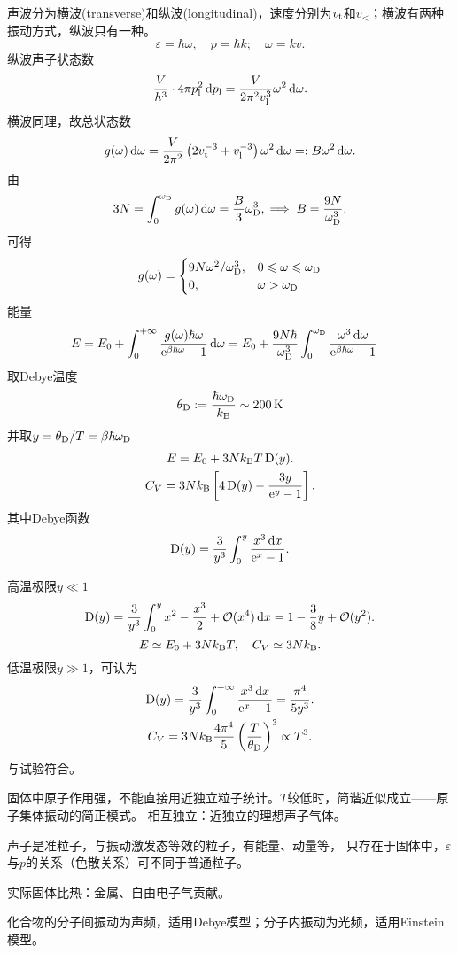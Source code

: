 声波分为横波(transverse)和纵波(longitudinal)，速度分别为$v_\mathrm t$和$v_\lt$；横波有两种振动方式，纵波只有一种。
\[
	\varepsilon=\hbar\omega,\quad p=\hbar k;\quad \omega=kv.
\]
纵波声子状态数
\[
	\frac V{h^3}\cdot 4\pi p_\mathrm l^2\mathop{}\!\mathrm{d} p_\mathrm l=\frac V{2\pi^2v_\mathrm l^3}\omega^2\mathop{}\!\mathrm{d}\omega.
\]
横波同理，故总状态数
\[
	g(\omega)\mathop{}\!\mathrm{d}\omega=\frac V{2\pi^2}\left(2v_\mathrm t^{-3}+v_\mathrm l^{-3}\right)\omega^2\mathop{}\!\mathrm{d}\omega=:B\omega^2\mathop{}\!\mathrm{d}\omega.
\]
由
\[
	3	N=\int_0^{\omega_\mathrm D}g(\omega)\mathop{}\!\mathrm{d}\omega=\frac B3\omega_\mathrm D^3,\implies B=\frac{9N}{\omega_\mathrm D^3}.
\]
可得
\begin{align*}
	g(\omega)=\begin{cases}
		9N\omega^2/\omega_\mathrm D^3,&0\leqslant\omega\leqslant\omega_\mathrm D\\
		0,&\omega>\omega_\mathrm D
	\end{cases}
\end{align*}
能量 
\begin{align*}
	E&=E_0+\int_0^{+\infty}\frac{ g(\omega)\hbar\omega}{\mathop{}\!\mathrm{e}^{\beta\hbar\omega}-1}\mathop{}\!\mathrm{d}\omega=E_0+\frac{9N\hbar}{\omega_\mathrm D^3}\int_0^{\omega_\mathrm D}\frac{\omega^3\mathop{}\!\mathrm{d}\omega}{\mathop{}\!\mathrm{e}^{\beta\hbar\omega}-1}
\end{align*}
取Debye温度
\[
	\theta_\Db:=\frac{\hbar\omega_\Db}\kB\sim\SI{200}\K
\]
并取$y=\theta_\mathrm D/T=\beta\hbar\omega_\mathrm D$
\begin{gather}
	E=E_0+3Nk_{\mathrm B} T\operatorname{D}(y).\\
	C_V=3Nk_{\mathrm B}\left[4\operatorname{D}(y)-\frac{3y}{\mathop{}\!\mathrm{e}^{y}-1}\right].
\end{gather}
其中Debye函数
\[
	\operatorname{D}(y)=\frac 3{y^3}\int_0^{y}\frac{x^3\mathop{}\!\mathrm{d} x}{\mathop{}\!\mathrm{e}^ x-1}.
\]

高温极限$y\ll 1$
\begin{align*}
	\operatorname{D}(y)=\frac3{y^3}\int_0^yx^2-\frac{x^3}2+\mathcal O(x^4)\mathop{}\!\mathrm{d} x=1-\frac38y+\mathcal O(y^2).
\end{align*}
\[
	E\simeq E_0+3Nk_{\mathrm B} T,\quad C_V\simeq 3Nk_{\mathrm B}.
\]
低温极限$y\gg 1$，可认为
\begin{gather}
	\notag
	\operatorname{D}(y)=\frac3{y^3}\int_0^{+\infty}\frac{x^3\mathop{}\!\mathrm{d} x}{\mathop{}\!\mathrm{e}^ x-1}=\frac{\pi^4}{5y^3}.\\
	\label{eqn:CV-Debye}
	C_V=3Nk_{\mathrm B}\frac{4\pi^4}5\left(\frac T{\theta_\mathrm D}\right)^3\propto T^3.
\end{gather}
与试验符合。
\begin{compactenum}
	\item 固体中原子作用强，不能直接用近独立粒子统计。$T$较低时，简谐近似成立——原子集体振动的简正模式。
	相互独立：近独立的理想声子气体。
	\item 声子是准粒子，与振动激发态等效的粒子，有能量、动量等，
	只存在于固体中，$\varepsilon$与$p$的关系（色散关系）可不同于普通粒子。
	\item 实际固体比热：金属、自由电子气贡献。

	化合物的分子间振动为声频，适用Debye模型；分子内振动为光频，适用Einstein模型。
\end{compactenum}
